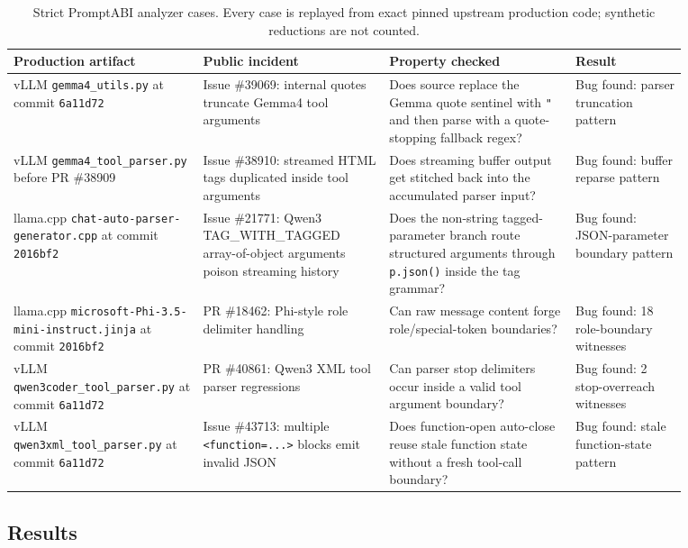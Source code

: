 \documentclass[10pt]{article}
\begin{document}
\begin{table}[h]
\centering
\small
\begin{tabular}{p{0.22\linewidth}p{0.25\linewidth}p{0.25\linewidth}p{0.15\linewidth}}
\toprule
Production artifact & Public incident & Property checked & Result \\
\midrule
vLLM \texttt{gemma4\_utils.py} at commit \texttt{6a11d72} &
Issue \#39069: internal quotes truncate Gemma4 tool arguments &
Does source replace the Gemma quote sentinel with \texttt{"} and then parse
with a quote-stopping fallback regex? &
Bug found: parser truncation pattern \\
\addlinespace
vLLM \texttt{gemma4\_tool\_parser.py} before PR \#38909 &
Issue \#38910: streamed HTML tags duplicated inside tool arguments &
Does streaming buffer output get stitched back into the accumulated parser
input? &
Bug found: buffer reparse pattern \\
\addlinespace
llama.cpp \texttt{chat-auto-parser-generator.cpp} at commit \texttt{2016bf2} &
Issue \#21771: Qwen3 TAG\_WITH\_TAGGED array-of-object arguments poison
streaming history &
Does the non-string tagged-parameter branch route structured arguments through
\texttt{p.json()} inside the tag grammar? &
Bug found: JSON-parameter boundary pattern \\
\addlinespace
llama.cpp \texttt{microsoft-Phi-3.5-mini-instruct.jinja} at commit
\texttt{2016bf2} &
PR \#18462: Phi-style role delimiter handling &
Can raw message content forge role/special-token boundaries? &
Bug found: 18 role-boundary witnesses \\
\addlinespace
vLLM \texttt{qwen3coder\_tool\_parser.py} at commit \texttt{6a11d72} &
PR \#40861: Qwen3 XML tool parser regressions &
Can parser stop delimiters occur inside a valid tool argument boundary? &
Bug found: 2 stop-overreach witnesses \\
\addlinespace
vLLM \texttt{qwen3xml\_tool\_parser.py} at commit \texttt{6a11d72} &
Issue \#43713: multiple \texttt{<function=...>} blocks emit invalid JSON &
Does function-open auto-close reuse stale function state without a fresh
tool-call boundary? &
Bug found: stale function-state pattern \\
\bottomrule
\end{tabular}
\caption{Strict PromptABI analyzer cases. Every case is replayed from exact
pinned upstream production code; synthetic reductions are not counted.}
\label{tab:eval}
\end{table}

\subsection{Results}
\end{document}
